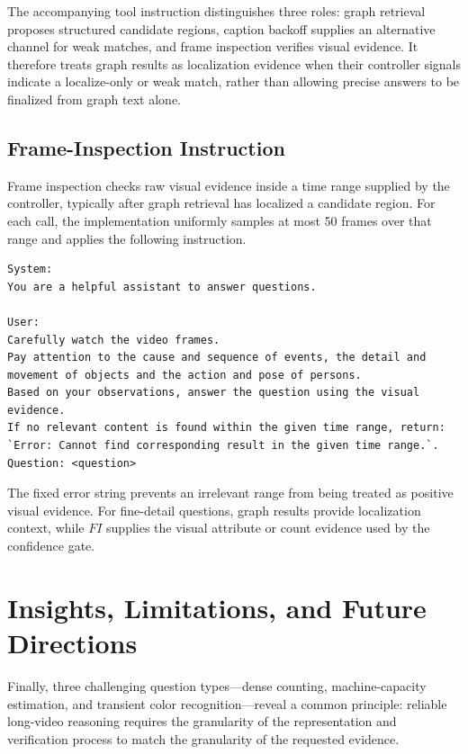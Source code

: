 \documentclass[11pt]{article}
\begin{document}
The accompanying tool instruction distinguishes three roles: graph retrieval proposes structured candidate regions, caption backoff supplies an alternative channel for weak matches, and frame inspection verifies visual evidence.
It therefore treats graph results as localization evidence when their controller signals indicate a localize-only or weak match, rather than allowing precise answers to be finalized from graph text alone.

\subsection{Frame-Inspection Instruction}

Frame inspection checks raw visual evidence inside a time range supplied by the controller, typically after graph retrieval has localized a candidate region.
For each call, the implementation uniformly samples at most 50 frames over that range and applies the following instruction.

\begin{lstlisting}
System:
You are a helpful assistant to answer questions.

User:
Carefully watch the video frames.
Pay attention to the cause and sequence of events, the detail and movement of objects and the action and pose of persons.
Based on your observations, answer the question using the visual evidence.
If no relevant content is found within the given time range, return: `Error: Cannot find corresponding result in the given time range.`.
Question: <question>
\end{lstlisting}

The fixed error string prevents an irrelevant range from being treated as positive visual evidence.
For fine-detail questions, graph results provide localization context, while $FI$ supplies the visual attribute or count evidence used by the confidence gate.

\section{Insights, Limitations, and Future Directions}
\label{sec:supp-limitations}

Finally, three challenging question types---dense counting, machine-capacity estimation, and transient color recognition---reveal a common principle: reliable long-video reasoning requires the granularity of the representation and verification process to match the granularity of the requested evidence.
\end{document}
